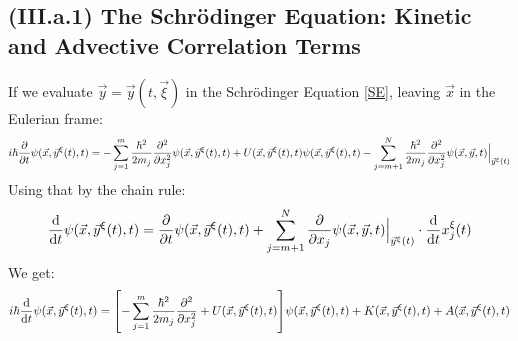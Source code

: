 \documentclass[11pt, a4paper]{article} %
\begin{document}
\subsection*{(III.a.1) The Schrödinger Equation: Kinetic and Advective Correlation Terms}
If we evaluate $\vec{y}=\vec{y}(t,\vec{\xi})$ in the Schrödinger Equation \eqref{SE}, leaving $\vec{x}$ in the Eulerian frame:
\begin{equation}
i\hbar \pdv{}{t}\psi(\vec{x}, \vec{y}^\xi(t),t)=-\sum_{j=1}^m \frac{\hbar^2}{2m_j}\pdv[2]{}{x_j} \psi(\vec{x}, \vec{y}^\xi(t),t) + U(\vec{x}, \vec{y}^\xi(t),t)\psi(\vec{x}, \vec{y}^\xi(t),t) -\sum_{j=m+1}^N \frac{\hbar^2}{2m_j}\pdv[2]{}{x_j} \psi(\vec{x}, \vec{y},t)\Big\rvert_{\vec{y}^\xi(t)}
\end{equation}
Using that by the chain rule:
\begin{equation}
\dv{}{t}\psi(\vec{x}, \vec{y}^\xi(t),t)=\pdv{}{t}\psi(\vec{x}, \vec{y}^\xi(t),t)+\sum_{j=m+1}^N \pdv{}{x_j}\psi(\vec{x}, \vec{y},t)\Big\rvert_{\vec{y}^\xi(t)}\cdot \dv{}{t}x^\xi_j(t)
\end{equation}
We get:
\begin{equation}\label{KinAdvEL}
i\hbar \dv{}{t}\psi(\vec{x}, \vec{y}^\xi(t),t)=\qty[-\sum_{j=1}^m \frac{\hbar^2}{2m_j}\pdv[2]{}{x_j} + U(\vec{x}, \vec{y}^\xi(t),t)]\psi(\vec{x}, \vec{y}^\xi(t),t)+K(\vec{x}, \vec{y}^\xi(t),t)+A(\vec{x}, \vec{y}^\xi(t),t)
\end{equation}
\end{document}

